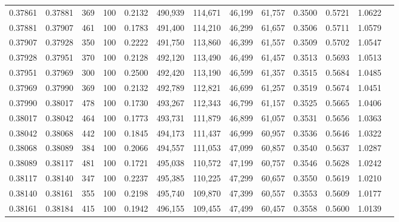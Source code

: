 \begin{tabular}{rrrrrrrrrrrrr}
0.37861 & 0.37881 &    369 & 100 &                                     0.2132 & 490,939 & 114,671 &  46,199 &  61,757 & 0.3500 & 0.5721 & 1.0622 \\
0.37881 & 0.37907 &    461 & 100 &                                     0.1783 & 491,400 & 114,210 &  46,299 &  61,657 & 0.3506 & 0.5711 & 1.0579 \\
0.37907 & 0.37928 &    350 & 100 &                                     0.2222 & 491,750 & 113,860 &  46,399 &  61,557 & 0.3509 & 0.5702 & 1.0547 \\
0.37928 & 0.37951 &    370 & 100 &                                     0.2128 & 492,120 & 113,490 &  46,499 &  61,457 & 0.3513 & 0.5693 & 1.0513 \\
0.37951 & 0.37969 &    300 & 100 &                                     0.2500 & 492,420 & 113,190 &  46,599 &  61,357 & 0.3515 & 0.5684 & 1.0485 \\
0.37969 & 0.37990 &    369 & 100 &                                     0.2132 & 492,789 & 112,821 &  46,699 &  61,257 & 0.3519 & 0.5674 & 1.0451 \\
0.37990 & 0.38017 &    478 & 100 &                                     0.1730 & 493,267 & 112,343 &  46,799 &  61,157 & 0.3525 & 0.5665 & 1.0406 \\
0.38017 & 0.38042 &    464 & 100 &                                     0.1773 & 493,731 & 111,879 &  46,899 &  61,057 & 0.3531 & 0.5656 & 1.0363 \\
0.38042 & 0.38068 &    442 & 100 &                                     0.1845 & 494,173 & 111,437 &  46,999 &  60,957 & 0.3536 & 0.5646 & 1.0322 \\
0.38068 & 0.38089 &    384 & 100 &                                     0.2066 & 494,557 & 111,053 &  47,099 &  60,857 & 0.3540 & 0.5637 & 1.0287 \\
0.38089 & 0.38117 &    481 & 100 &                                     0.1721 & 495,038 & 110,572 &  47,199 &  60,757 & 0.3546 & 0.5628 & 1.0242 \\
0.38117 & 0.38140 &    347 & 100 &                                     0.2237 & 495,385 & 110,225 &  47,299 &  60,657 & 0.3550 & 0.5619 & 1.0210 \\
0.38140 & 0.38161 &    355 & 100 &                                     0.2198 & 495,740 & 109,870 &  47,399 &  60,557 & 0.3553 & 0.5609 & 1.0177 \\
0.38161 & 0.38184 &    415 & 100 &                                     0.1942 & 496,155 & 109,455 &  47,499 &  60,457 & 0.3558 & 0.5600 & 1.0139 \\

\end{tabular}
